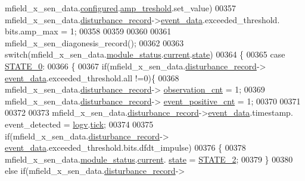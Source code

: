 \begin{DoxyCode}
      mfield\_x\_sen\_data.\hyperlink{a00025_a94b2d1f6ea4ab334c74d24984dd27843}{configured}.\hyperlink{a00021_a4b3bbfb0267daea1432f2603825ade62}{amp\_treshold}.set\_value)
00357         mfield\_x\_sen\_data.\hyperlink{a00025_ac9b38e2c1d3f1013a88d33506c754152}{disturbance\_record}->\hyperlink{a00028_a8c0bda69e71ef674e60da47ad0be9ab0}{event\_data}.exceeded\_threshold.
      bits.amp\_max = 1;
00358 
00359 
00360 
00361    mfield\_x\_sen\_diagonesis\_record();
00362 
00363     \textcolor{keywordflow}{switch}(mfield\_x\_sen\_data.\hyperlink{a00025_adfab5a5d8b45a93dfb13edb24e2b80e3}{module\_status}.\hyperlink{a00019_acf41ffc11da291c2f9f0fcb02ee72b98}{current}.\hyperlink{a00019_a6b8d8e916bc56265a3fd279bd26b6d1b}{state})
00364     \{
00365         \textcolor{keywordflow}{case} \hyperlink{a00021_ad6739dbbe5581cac99b7dc8a5e09949c}{STATE\_0}:
00366         \{
00367             \textcolor{keywordflow}{if}(mfield\_x\_sen\_data.\hyperlink{a00025_ac9b38e2c1d3f1013a88d33506c754152}{disturbance\_record}->
      \hyperlink{a00028_a8c0bda69e71ef674e60da47ad0be9ab0}{event\_data}.exceeded\_threshold.all !=0)\{
00368             mfield\_x\_sen\_data.\hyperlink{a00025_ac9b38e2c1d3f1013a88d33506c754152}{disturbance\_record}->
      \hyperlink{a00028_ad5b0bac02ce266b91b2b52a1c3ea1d78}{observation\_cnt}    = 1;
00369             mfield\_x\_sen\_data.\hyperlink{a00025_ac9b38e2c1d3f1013a88d33506c754152}{disturbance\_record}->
      \hyperlink{a00028_a7397b9d76d4b57500f27bb23d258a18a}{event\_positive\_cnt} = 1;
00370 
00371 
00372 
00373             mfield\_x\_sen\_data.\hyperlink{a00025_ac9b38e2c1d3f1013a88d33506c754152}{disturbance\_record}->\hyperlink{a00028_a8c0bda69e71ef674e60da47ad0be9ab0}{event\_data}.timestamp.
      event\_detected = \hyperlink{a00021_a2e89c46668b39a17753c238950c9e1ec}{logv}.\hyperlink{a00021_a81f0ce68c2c483fb8df726cc1988d8e8}{tick};
00374 
00375              \textcolor{keywordflow}{if}(mfield\_x\_sen\_data.\hyperlink{a00025_ac9b38e2c1d3f1013a88d33506c754152}{disturbance\_record}->
      \hyperlink{a00028_a8c0bda69e71ef674e60da47ad0be9ab0}{event\_data}.exceeded\_threshold.bits.dfdt\_impulse)
00376              \{
00378                  mfield\_x\_sen\_data.\hyperlink{a00025_adfab5a5d8b45a93dfb13edb24e2b80e3}{module\_status}.\hyperlink{a00019_acf41ffc11da291c2f9f0fcb02ee72b98}{current}.
      \hyperlink{a00019_a6b8d8e916bc56265a3fd279bd26b6d1b}{state} = \hyperlink{a00021_a66fa48e832a64af4d405511cecc4c752}{STATE\_2};
00379              \}
00380              \textcolor{keywordflow}{else} \textcolor{keywordflow}{if}(mfield\_x\_sen\_data.\hyperlink{a00025_ac9b38e2c1d3f1013a88d33506c754152}{disturbance\_record}->

\end{DoxyCode}
